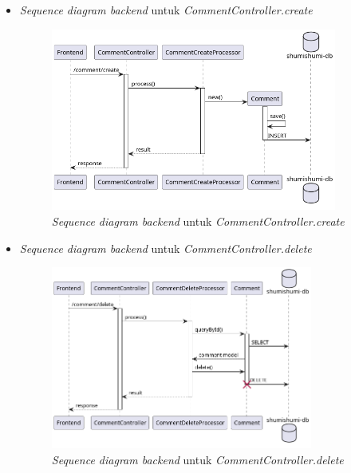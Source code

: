 \documentclass[a4paper]{article}
\begin{document}
\begin{enumerate}
\begin{enumerate}
\begin{itemize}
            \newpage
            \item \textit{Sequence diagram backend} untuk \textit{CommentController.create}
            \begin{figure}[h]
                \centering
                \includegraphics*[height=6cm]{diagram/sequence diagram/BE/comment controller/create/create.png}
                \caption{\textit{Sequence diagram backend} untuk \textit{CommentController.create}}
            \end{figure}

            \item \textit{Sequence diagram backend} untuk \textit{CommentController.delete}
            \begin{figure}[h]
                \centering
                \includegraphics*[height=6cm]{diagram/sequence diagram/BE/comment controller/delete/delete.png}
                \caption{\textit{Sequence diagram backend} untuk \textit{CommentController.delete}}
            \end{figure}


\end{itemize}
\end{enumerate}
\end{enumerate}
\end{document}
